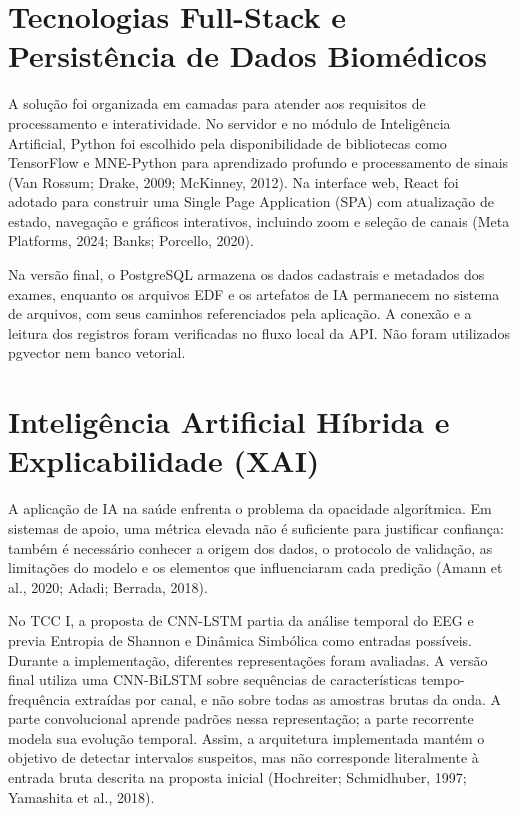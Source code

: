 \section{Tecnologias Full-Stack e Persistência de Dados Biomédicos}
A solução foi organizada em camadas para atender aos requisitos de processamento e interatividade. No servidor e no módulo de Inteligência Artificial, Python foi escolhido pela disponibilidade de bibliotecas como TensorFlow e MNE-Python para aprendizado profundo e processamento de sinais (Van Rossum; Drake, 2009; McKinney, 2012). Na interface web, React foi adotado para construir uma Single Page Application (SPA) com atualização de estado, navegação e gráficos interativos, incluindo zoom e seleção de canais (Meta Platforms, 2024; Banks; Porcello, 2020).

Na versão final, o PostgreSQL armazena os dados cadastrais e metadados dos exames, enquanto os arquivos EDF e os artefatos de IA permanecem no sistema de arquivos, com seus caminhos referenciados pela aplicação. A conexão e a leitura dos registros foram verificadas no fluxo local da API. Não foram utilizados pgvector nem banco vetorial.

\section{Inteligência Artificial Híbrida e Explicabilidade (XAI)}
A aplicação de IA na saúde enfrenta o problema da opacidade algorítmica. Em sistemas de apoio, uma métrica elevada não é suficiente para justificar confiança: também é necessário conhecer a origem dos dados, o protocolo de validação, as limitações do modelo e os elementos que influenciaram cada predição (Amann et al., 2020; Adadi; Berrada, 2018).

No TCC I, a proposta de CNN-LSTM partia da análise temporal do EEG e previa Entropia de Shannon e Dinâmica Simbólica como entradas possíveis. Durante a implementação, diferentes representações foram avaliadas. A versão final utiliza uma CNN-BiLSTM sobre sequências de características tempo-frequência extraídas por canal, e não sobre todas as amostras brutas da onda. A parte convolucional aprende padrões nessa representação; a parte recorrente modela sua evolução temporal. Assim, a arquitetura implementada mantém o objetivo de detectar intervalos suspeitos, mas não corresponde literalmente à entrada bruta descrita na proposta inicial (Hochreiter; Schmidhuber, 1997; Yamashita et al., 2018).

